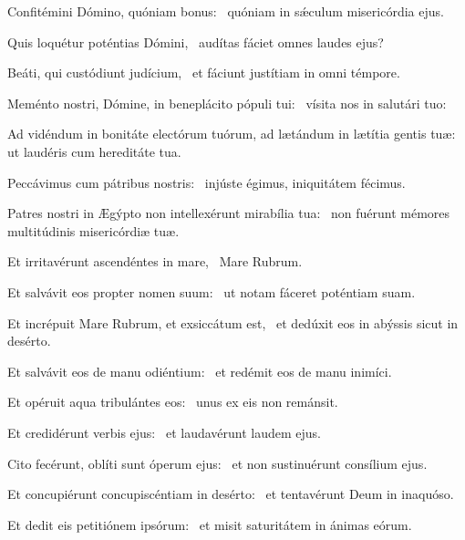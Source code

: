 \item Confitémini Dómino, quóniam bonus:~\psstar{} quóniam in sǽculum misericórdia ejus.

\item Quis loquétur poténtias Dómini,~\psstar{} audítas fáciet omnes laudes ejus?

\item Beáti, qui custódiunt judícium,~\psstar{} et fáciunt justítiam in omni témpore.

\item Meménto nostri, Dómine, in beneplácito pópuli tui:~\psstar{} vísita nos in salutári tuo:

\item Ad vidéndum in bonitáte electórum tuórum, ad lætándum in lætítia gentis tuæ:~\psstar{} ut laudéris cum hereditáte tua.

\item Peccávimus cum pátribus nostris:~\psstar{} injúste égimus, iniquitátem fécimus.

\item Patres nostri in Ægýpto non intellexérunt mirabília tua:~\psstar{} non fuérunt mémores multitúdinis misericórdiæ tuæ.

\item Et irritavérunt ascendéntes in mare,~\psstar{} Mare Rubrum.

\item Et salvávit eos propter nomen suum:~\psstar{} ut notam fáceret poténtiam suam.

\item Et incrépuit Mare Rubrum, et exsiccátum est,~\psstar{} et dedúxit eos in abýssis sicut in desérto.

\item Et salvávit eos de manu odiéntium:~\psstar{} et redémit eos de manu inimíci.

\item Et opéruit aqua tribulántes eos:~\psstar{} unus ex eis non remánsit.

\item Et credidérunt verbis ejus:~\psstar{} et laudavérunt laudem ejus.

\item Cito fecérunt, oblíti sunt óperum ejus:~\psstar{} et non sustinuérunt consílium ejus.

\item Et concupiérunt concupiscéntiam in desérto:~\psstar{} et tentavérunt Deum in inaquóso.

\item Et dedit eis petitiónem ipsórum:~\psstar{} et misit saturitátem in ánimas eórum.

